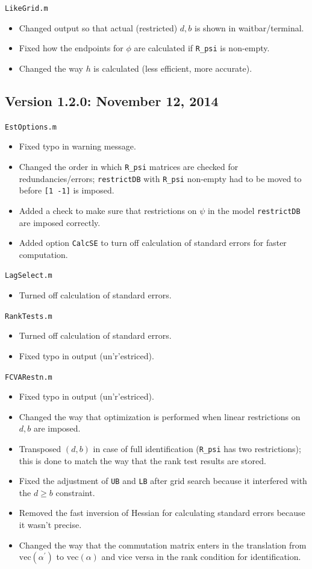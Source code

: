 \documentclass[10pt]{article}
\begin{document}
\noindent \verb|LikeGrid.m|
\begin{itemize}
\item Changed output so that actual (restricted) $d,b$ is shown in waitbar/terminal.
\item Fixed how the endpoints for $\phi$ are calculated if \verb|R_psi| is non-empty.
\item Changed the way $h$ is calculated (less efficient, more accurate).
\end{itemize}

\subsection{Version 1.2.0: November 12, 2014}

\noindent \verb|EstOptions.m|
\begin{itemize}
\item Fixed typo in warning message.
\item Changed the order in which \verb|R_psi| matrices are checked for redundancies/errors; \verb|restrictDB| with \verb|R_psi| non-empty had to be moved to before \verb|[1 -1]| is imposed.
\item Added a check to make sure that restrictions on $\psi$ in the model \verb|restrictDB| are imposed correctly.
\item Added option \verb|CalcSE| to turn off calculation of standard errors for faster computation.
\end{itemize}

\noindent \verb|LagSelect.m|
\begin{itemize}
\item Turned off calculation of standard errors.
\end{itemize}

\noindent \verb|RankTests.m|
\begin{itemize}
\item Turned off calculation of standard errors.
\item Fixed typo in output (un'r'estriced).
\end{itemize}

\noindent \verb|FCVARestn.m|
\begin{itemize}
\item Fixed typo in output (un'r'estriced).
\item Changed the way that optimization is performed when linear restrictions on $d,b$ are imposed. 
\item Transposed $(d,b)$ in case of full identification (\verb|R_psi| has two restrictions); this is done to match the way that the rank test results are stored.
\item Fixed the adjustment of \verb|UB| and \verb|LB| after grid search because it interfered with the $d \geq b$ constraint.
\item Removed the fast inversion of Hessian for calculating standard errors because it wasn't precise.
\item Changed the way that the commutation matrix enters in the translation from $\text{vec}(\alpha ^\prime)$ to $\text{vec}(\alpha)$ and vice versa in the rank condition for identification.
\end{itemize}
\end{document}
